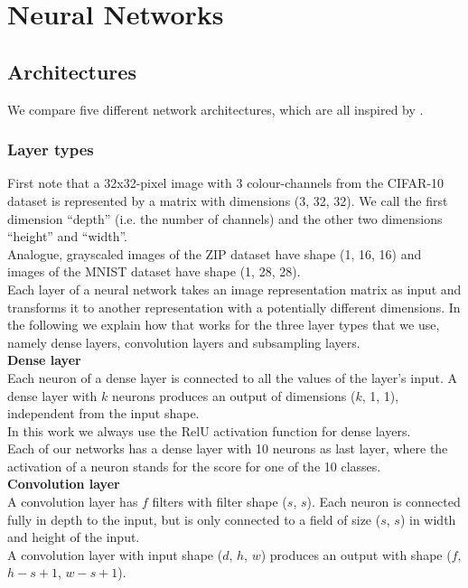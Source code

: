 
\section{Neural Networks}

\subsection{Architectures}

We compare five different network architectures,
which are all inspired by \cite{lecun98}.

\subsubsection{Layer types}

First note that a 32x32-pixel image with 3 colour-channels from the CIFAR-10 dataset is represented
by a matrix with dimensions (3, 32, 32).
We call the first dimension ``depth'' (i.e. the number of channels) and the other two dimensions ``height'' and ``width''.\\
Analogue, grayscaled images of the ZIP dataset have shape (1, 16, 16)
and images of the MNIST dataset have shape (1, 28, 28).\\

Each layer of a neural network takes an image representation matrix as input and transforms it to
another representation with a potentially different dimensions.
In the following we explain how that works for the three layer types that we use,
namely dense layers, convolution layers and subsampling layers.\\

\textbf{Dense layer}\\

Each neuron of a dense layer is connected to all the values of the layer's input.
A dense layer with $k$ neurons produces an output of dimensions ($k$, 1, 1), independent from the input shape.\\
In this work we always use the RelU activation function for dense layers.\\
Each of our networks has a dense layer with 10 neurons as last layer,
where the activation of a neuron stands for the score for one of the
10 classes.\\

\textbf{Convolution layer}\\

A convolution layer has $f$ filters with filter shape ($s$, $s$).
Each neuron is connected fully in depth to the input, but is only connected to a field of size ($s$, $s$)
in width and height of the input.\\
A convolution layer with input shape ($d$, $h$, $w$) produces an output with shape ($f$, $h-s+1$, $w-s+1$).\\

